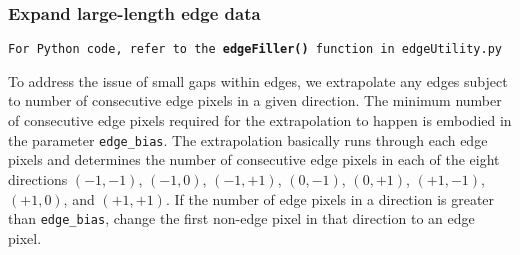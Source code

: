 \documentclass[11pt]{article}
\begin{document}
\subsubsection{Expand large-length edge data}
\begin{center}
\texttt{For Python code, refer to the {\bf edgeFiller()} function in edgeUtility.py}
\end{center}
To address the issue of small gaps within edges, we extrapolate any edges subject to number of consecutive edge pixels in a given direction. The minimum number of consecutive edge pixels required for the extrapolation to happen is embodied in the parameter \texttt{edge_bias}. The extrapolation basically runs through each edge pixels and determines the number of consecutive edge pixels in each of the eight directions $(-1,-1)$, $(-1,0)$, $(-1,+1)$, $(0,-1)$, $(0,+1)$, $(+1,-1)$, $(+1,0)$, and $(+1,+1)$. If the number of edge pixels in a direction is greater than \texttt{edge_bias}, change the first non-edge pixel in that direction to an edge pixel.
\end{document}
